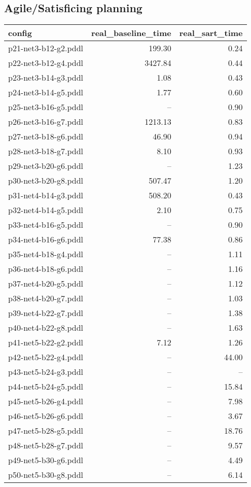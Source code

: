 \documentclass{article}
\begin{document}
                    \subsection*{Agile/Satisficing planning}
                    
                            \begin{center}
                            \scriptsize
                            \begin{tabular}{@{}l|r|r@{}}
                            config & real\_baseline\_time & real\_sart\_time\\\midrule
                             p21-net3-b12-g2.pddl&199.30&0.24\\
 p22-net3-b12-g4.pddl&3427.84&0.44\\
 p23-net3-b14-g3.pddl&1.08&0.43\\
 p24-net3-b14-g5.pddl&1.77&0.60\\
 p25-net3-b16-g5.pddl&--&0.90\\
 p26-net3-b16-g7.pddl&1213.13&0.83\\
 p27-net3-b18-g6.pddl&46.90&0.94\\
 p28-net3-b18-g7.pddl&8.10&0.93\\
 p29-net3-b20-g6.pddl&--&1.23\\
 p30-net3-b20-g8.pddl&507.47&1.20\\
 p31-net4-b14-g3.pddl&508.20&0.43\\
 p32-net4-b14-g5.pddl&2.10&0.75\\
 p33-net4-b16-g5.pddl&--&0.90\\
 p34-net4-b16-g6.pddl&77.38&0.86\\
 p35-net4-b18-g4.pddl&--&1.11\\
 p36-net4-b18-g6.pddl&--&1.16\\
 p37-net4-b20-g5.pddl&--&1.12\\
 p38-net4-b20-g7.pddl&--&1.03\\
 p39-net4-b22-g7.pddl&--&1.38\\
 p40-net4-b22-g8.pddl&--&1.63\\
 p41-net5-b22-g2.pddl&7.12&1.26\\
 p42-net5-b22-g4.pddl&--&44.00\\
 p43-net5-b24-g3.pddl&--&--\\
 p44-net5-b24-g5.pddl&--&15.84\\
 p45-net5-b26-g4.pddl&--&7.98\\
 p46-net5-b26-g6.pddl&--&3.67\\
 p47-net5-b28-g5.pddl&--&18.76\\
 p48-net5-b28-g7.pddl&--&9.57\\
 p49-net5-b30-g6.pddl&--&4.49\\
 p50-net5-b30-g8.pddl&--&6.14
                            \end{tabular}
                            \end{center}
                    
\end{document}
